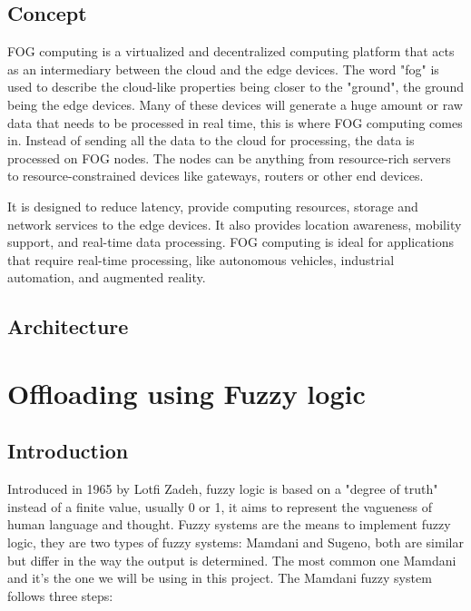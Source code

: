 \section{Concept}
\label{sec:fog-concept}

FOG computing is a virtualized and decentralized computing platform that acts as an intermediary between the cloud and
the edge devices. The word "fog" is used to describe the cloud-like properties being closer to the "ground", the ground
being the edge devices. Many of these devices will generate a huge amount or raw data that needs to be processed in real
time, this is where FOG computing comes in. Instead of sending all the data to the cloud for processing, the data is
processed on FOG nodes. The nodes can be anything from resource-rich servers to resource-constrained devices like
gateways, routers or other end devices.

It is designed to reduce latency, provide computing resources, storage and network services to the edge
devices. It also provides location awareness, mobility support, and real-time data processing. FOG computing is ideal
for applications that require real-time processing, like autonomous vehicles, industrial automation, and augmented
reality.

\section{Architecture}
\label{sec:fog-architecture}

\chapter{Offloading using Fuzzy logic}
\label{chap:fuzzy}

\section{Introduction}
\label{sec:fuzzy-intro}

Introduced in 1965 by Lotfi Zadeh,\cite{zadeh-1965} fuzzy logic is based on a "degree of truth" instead of a finite
value, usually 0 or 1, it aims to represent the vagueness of human language and thought. Fuzzy systems are the means
to implement fuzzy logic, they are two types of fuzzy systems: Mamdani and Sugeno, both are similar but differ in the
way the output is determined. The most common one Mamdani and it's the one we will be using in this project. The
Mamdani fuzzy system follows three steps:

